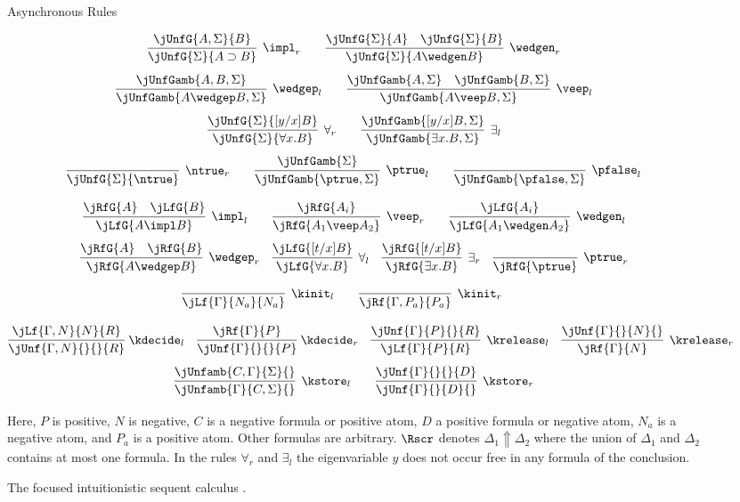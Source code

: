 \documentclass{llncs}
\begin{document}
\begin{figure}
{\sc Asynchronous Rules}

\[
  \infer[\impl_r]{\jUnfG{\Sigma}{A \supset B}}{\jUnfG{A,\Sigma}{B}}   
  \qquad
  \infer[\wedgen_r]{\jUnfG{\Sigma}{A \wedgen B}}
                   {\jUnfG{\Sigma}{A} \quad \jUnfG{\Sigma}{B}}
\]
\[
  \infer[\wedgep_l]{\jUnfGamb{A\wedgep B,\Sigma}}{\jUnfGamb{A , B, \Sigma}}
  \qquad
  \infer[\veep_l]{\jUnfGamb{A\veep B,\Sigma}}
        {\jUnfGamb{A,\Sigma}\quad \jUnfGamb{B,\Sigma}}
\]
\[
  \infer[\forall_r]{\jUnfG{\Sigma}{\forall x.B}}{\jUnfG{\Sigma}{[y/x]B}}
  \qquad
  \infer[\exists_l]{\jUnfGamb{\exists x.B, \Sigma}}{\jUnfGamb{[y/x]B,\Sigma}}
 \]
\[
  \infer[\ntrue_r]{\jUnfG{\Sigma}{\ntrue}}{}\qquad
  \infer[\ptrue_l]{\jUnfGamb{\ptrue, \Sigma}}{\jUnfGamb{\Sigma}}
   \qquad
  \infer[\pfalse_l]{\jUnfGamb{\pfalse, \Sigma}}{}
\]


\[ 
  \infer[\impl_l]{\jLfG{A \impl B}}{  \jRfG{A}\quad \jLfG{B}}
  \qquad
  \infer[\veep_r]{ \jRfG{A_1 \veep A_2}}{\jRfG{A_i}}
  \qquad
  \infer[\wedgen_l]{\jLfG {A_1 \wedgen A_2}}{\jLfG{A_i}}
\]
\[
  \infer[\wedgep_r]{\jRfG{A \wedgep B}}{\jRfG{A} \quad \jRfG{B}}
  \quad
  \infer[\forall_l]{\jLfG{\forall x.B}}{\jLfG{[t/x]B}}
  \quad
  \infer[\exists_r]{\jRfG{\exists x.B}}{\jRfG{[t/x]B}}
  \quad
  \infer[\ptrue_r]{\jRfG{\ptrue}}{}
\]


\[
  \infer[\kinit_l]{\jLf{\Gamma}{N_a}{N_a}}{}
  \qquad
  \infer[\kinit_r]{\jRf{\Gamma,P_a}{P_a}}{}
  \qquad
\]


\[
  \infer[\kern -2pt \kdecide_l]{\jUnf{\Gamma,N}{}{}{R}}{\jLf{\Gamma,N}{N}{R}}
  \quad
  \infer[\kern -2 pt \kdecide_r]{\jUnf{\Gamma}{}{}{P}}{\jRf{\Gamma}{P}}
  \quad
  \infer[\krelease_l]{\jLf{\Gamma}{P}{R}}{\jUnf{\Gamma}{P}{}{R}}
  \quad
  \infer[\krelease_r]{\jRf{\Gamma}{N}}{ \jUnf{\Gamma}{}{N}{}}
\]
\[
\infer[\kstore_l]{\jUnfamb{\Gamma}{C,\Sigma}{}}
                 {\jUnfamb{C,\Gamma}{\Sigma}{}}
  \qquad
  \infer[\kstore_r]{\jUnf{\Gamma}{}{D}{}}{\jUnf{\Gamma}{}{}{D}}
\]

Here, $P$ is positive, $N$ is negative, $C$ is a negative formula or
positive atom, $D$ a positive formula or negative atom, $N_a$ is a
negative atom, and $P_a$ is a positive atom.  Other formulas are
arbitrary. $\Rscr$ denotes $\Delta_1 \Uparrow \Delta_2$ where the
union of $\Delta_1$ and $\Delta_2$ contains at most one formula.  
In the rules $\forall_r$  and $\exists_l$ the
eigenvariable $y$ does not occur free in any formula of the
conclusion.
\caption{The focused intuitionistic sequent calculus \LJF.}
\label{fig:ljf}
\end{figure}	
\end{document}

